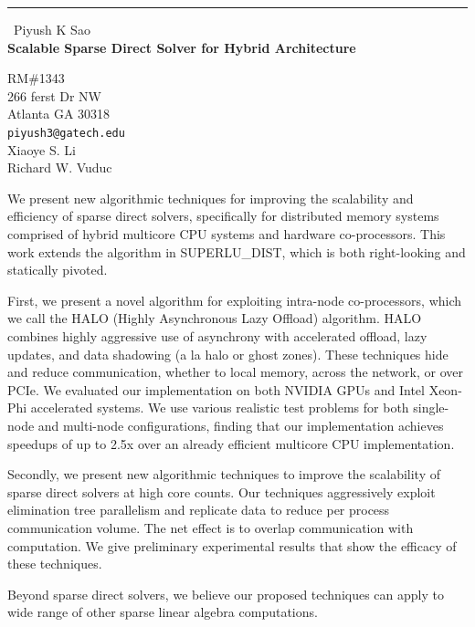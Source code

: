 \documentclass{report}
\begin{document}
\begin{center}
\rule{6in}{1pt} \
{\large Piyush K Sao \\
{\bf Scalable Sparse Direct Solver for Hybrid Architecture}}

RM\#1343 \\ 266 ferst Dr NW \\ Atlanta GA 30318
\\
{\tt piyush3@gatech.edu}\\
Xiaoye S.  Li \\
Richard W. Vuduc\end{center}

We present new algorithmic techniques for improving the scalability
and efficiency of sparse direct solvers, specifically for distributed
memory systems comprised of hybrid multicore CPU systems and hardware
co-processors. This work extends the algorithm in SUPERLU\_DIST, which is
both right-looking and statically pivoted.

First, we present a novel algorithm for exploiting intra-node
co-processors, which we call the HALO (Highly Asynchronous Lazy Offload)
algorithm. HALO combines highly aggressive use of asynchrony with
accelerated offload, lazy updates, and data shadowing (a la halo or ghost
zones). These techniques hide and reduce communication, whether to local
memory, across the network, or over PCIe. We evaluated our implementation
on both NVIDIA GPUs and Intel Xeon-Phi accelerated systems. We use
various realistic test problems for both single-node and multi-node
configurations, finding that our implementation achieves
speedups of up to 2.5x over an already efficient multicore CPU implementation.

Secondly, we present new algorithmic techniques to improve the
scalability of sparse direct solvers at high core counts. Our techniques
aggressively exploit elimination tree parallelism and replicate data to
reduce per process communication volume. The net effect is to overlap
communication with computation. We give preliminary experimental results
that show the efficacy of these techniques.

Beyond sparse direct solvers, we believe our proposed techniques can
apply to wide range of other sparse linear algebra computations.
\end{document}
